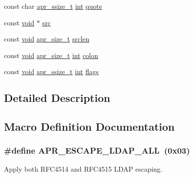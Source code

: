 \begin{DoxyCompactItemize}
\item 
const char \hyperlink{group__apr__platform_ga215ebb88932bee220b766263ebbfe6fa}{apr\+\_\+ssize\+\_\+t} \hyperlink{pcre_8txt_a42dfa4ff673c82d8efe7144098fbc198}{int} \hyperlink{group__APR__Util__Escaping_gaae211dea60c8fe440abf2fb32c0985bc}{quote}
\item 
const \hyperlink{group__MOD__ISAPI_gacd6cdbf73df3d9eed42fa493d9b621a6}{void} $\ast$ \hyperlink{group__APR__Util__Escaping_gab3b4066b211a3d1de8f72e90b2bca8ab}{src}
\item 
const \hyperlink{group__MOD__ISAPI_gacd6cdbf73df3d9eed42fa493d9b621a6}{void} \hyperlink{group__apr__platform_gaaa72b2253f6f3032cefea5712a27540e}{apr\+\_\+size\+\_\+t} \hyperlink{group__APR__Util__Escaping_ga780d813f1c57932b70208595e2a312d4}{srclen}
\item 
const \hyperlink{group__MOD__ISAPI_gacd6cdbf73df3d9eed42fa493d9b621a6}{void} \hyperlink{group__apr__platform_gaaa72b2253f6f3032cefea5712a27540e}{apr\+\_\+size\+\_\+t} \hyperlink{pcre_8txt_a42dfa4ff673c82d8efe7144098fbc198}{int} \hyperlink{group__APR__Util__Escaping_ga6299e50771f9eb5ee423ea0611f1c896}{colon}
\item 
const \hyperlink{group__MOD__ISAPI_gacd6cdbf73df3d9eed42fa493d9b621a6}{void} \hyperlink{group__apr__platform_ga215ebb88932bee220b766263ebbfe6fa}{apr\+\_\+ssize\+\_\+t} \hyperlink{pcre_8txt_a42dfa4ff673c82d8efe7144098fbc198}{int} \hyperlink{group__APR__Util__Escaping_gadee72226bb2084ef68a7f81620fdafd4}{flags}
\end{DoxyCompactItemize}


\subsection{Detailed Description}


\subsection{Macro Definition Documentation}
\subsubsection[{\texorpdfstring{A\+P\+R\+\_\+\+E\+S\+C\+A\+P\+E\+\_\+\+L\+D\+A\+P\+\_\+\+A\+LL}{APR_ESCAPE_LDAP_ALL}}]{\setlength{\rightskip}{0pt plus 5cm}\#define A\+P\+R\+\_\+\+E\+S\+C\+A\+P\+E\+\_\+\+L\+D\+A\+P\+\_\+\+A\+LL~(0x03)}\hypertarget{group__APR__Util__Escaping_ga047bef19e40c76df29afd5ec076af0fc}{}\label{group__APR__Util__Escaping_ga047bef19e40c76df29afd5ec076af0fc}
Apply both R\+F\+C4514 and R\+F\+C4515 L\+D\+AP escaping. 
